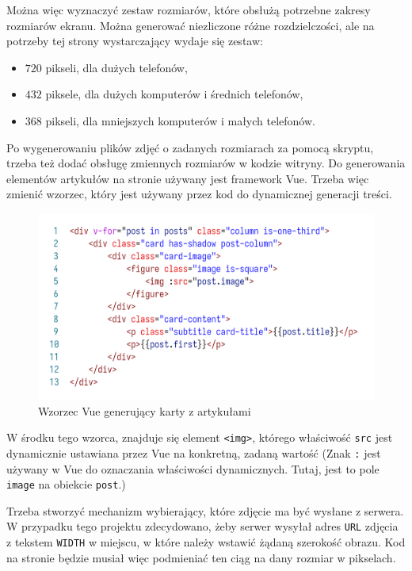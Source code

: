 \documentclass[licencjacka]{pracadypl}
\begin{document}
Można więc wyznaczyć zestaw rozmiarów, które obsłużą potrzebne zakresy rozmiarów ekranu. Można generować niezliczone różne rozdzielczości, ale na potrzeby tej strony wystarczający wydaje się zestaw:

\begin{itemize}
  \item $720$ pikseli, dla dużych telefonów,
  \item $432$ piksele, dla dużych komputerów i średnich telefonów,
  \item $368$ pikseli, dla mniejszych komputerów i małych telefonów.
\end{itemize}
 
Po wygenerowaniu plików zdjęć o zadanych rozmiarach za pomocą skryptu, trzeba też dodać obsługę zmiennych rozmiarów w kodzie witryny. Do generowania elementów artykułów na stronie używany jest framework Vue. Trzeba więc zmienić wzorzec, który jest używany przez kod do dynamicznej generacji treści.

\begin{figure}[H]
  \includegraphics[width=\linewidth]{images/code-vue-image-card-old.png}
  \caption{Wzorzec Vue generujący karty z artykułami}
  \label{fig:code-vue-template-articles-old}
\end{figure}

W środku tego wzorca, znajduje się element \texttt{<img>}, którego właściwość \texttt{src} jest dynamicznie ustawiana przez Vue na konkretną, zadaną wartość (Znak \texttt{:} jest używany w Vue do oznaczania właściwości dynamicznych. Tutaj, jest to pole \texttt{image} na obiekcie \texttt{post}.)

Trzeba stworzyć mechanizm wybierający, które zdjęcie ma być wysłane z serwera. W przypadku tego projektu zdecydowano, żeby serwer wysyłał adres \texttt{URL} zdjęcia z tekstem \texttt{WIDTH} w miejscu, w które należy wstawić żądaną szerokość obrazu. Kod na stronie będzie musiał więc podmieniać ten ciąg na dany rozmiar w pikselach.
\end{document}
